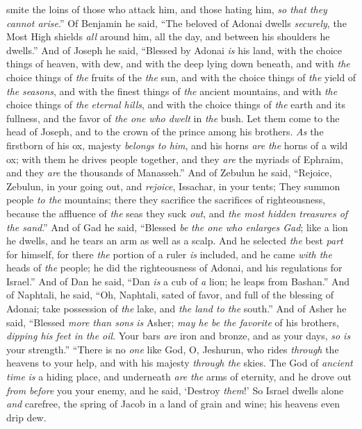 \begin{biblechapter}
smite the loins of those who attack him, 
and those hating him, \textit{so that they cannot arise}.”
\verse Of Benjamin he said, 
“The beloved of Adonai dwells \textit{securely}, 
the Most High shields \textit{all} around him, 
all the day, 
and between his shoulders he dwells.”
\verse And of Joseph he said, 
“Blessed by Adonai \textit{is} his land, 
with the choice things of heaven, 
with dew, and with the deep lying down beneath,
\verse and with \textit{the} choice things of \textit{the} fruits of the \textit{the} sun, 
and with the choice things of \textit{the} yield of \textit{the} \textit{seasons},
\verse and with the finest things of \textit{the} ancient mountains, 
and with \textit{the} choice things of \textit{the} \textit{eternal hills},
\verse and with the choice things of \textit{the} earth and its fullness, 
and the favor of \textit{the one} \textit{who dwelt} in \textit{the} bush. 
Let them come to the head of Joseph, 
and to the crown of the prince among his brothers.
\verse \textit{As} the firstborn of his ox, majesty \textit{belongs to him}, 
and his horns \textit{are} \textit{the} horns of a wild ox; 
with them he drives people together, 
and they \textit{are} the myriads of Ephraim, 
and they \textit{are} the thousands of Manasseh.”
\verse And of Zebulun he said, 
“Rejoice, Zebulun, in your going out, 
and \textit{rejoice}, Issachar, in your tents;
\verse They summon people \textit{to the} mountains; 
there they sacrifice the sacrifices of righteousness, 
because the affluence of \textit{the} seas they suck \textit{out}, 
and \textit{the most hidden treasures of the sand}.”
\verse And of Gad he said, 
“Blessed \textit{be} \textit{the one who enlarges Gad}; 
like a lion he dwells, 
and he tears an arm as well as a scalp.
\verse And he selected \textit{the} best \textit{part} for himself,  
for there \textit{the} portion of a ruler \textit{is} included, 
and he came \textit{with the} heads of \textit{the} people; 
he did the righteousness of Adonai, 
and his regulations for Israel.”
\verse And of Dan he said, 
“Dan \textit{is} a cub of \textit{a} lion; 
he leaps from Bashan.”
\verse And of Naphtali, he said, 
“Oh, Naphtali, sated of favor, 
and full of the blessing of Adonai; 
take possession of \textit{the} lake, 
and \textit{the land to the} south.”
\verse And of Asher he said, 
“Blessed \textit{more than sons} \textit{is} Asher; 
\textit{may he be the favorite} of his brothers, 
\textit{dipping his feet in the oil}.
\verse Your bars \textit{are} iron and bronze, 
and as your days, \textit{so is} your strength.”
\verse “There is no \textit{one} like God, O, Jeshurun, 
who rides \textit{through} the heavens to your help, 
and with his majesty \textit{through the} skies.
\verse The God of \textit{ancient time} \textit{is} a hiding place, 
and underneath \textit{are} \textit{the} arms of eternity, 
and he drove out \textit{from before} you your enemy, 
and he said, ‘Destroy \textit{them}!’
\verse So Israel dwells alone \textit{and} carefree, 
the spring of Jacob in a land of grain and wine; 
his heavens even drip dew.
\end{biblechapter}

